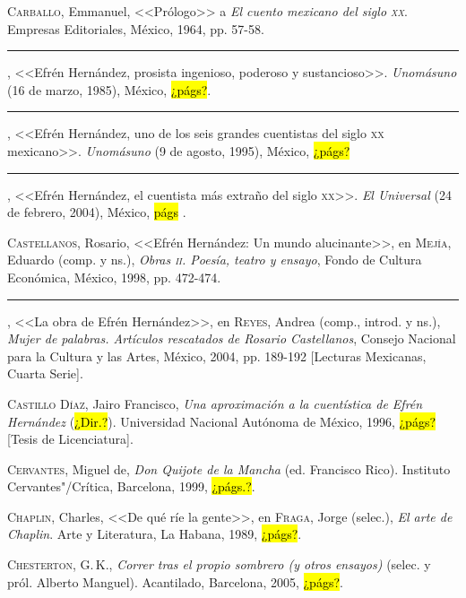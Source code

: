 \documentclass[14pt,twoside,final]{extbook} %
\begin{document}
\textsc{Carballo}, Emmanuel, <<Prólogo>> a \emph{El cuento mexicano del siglo \textsc{xx}}. Empresas Editoriales, México, 1964, pp. 57-58.\label{bib:carballo1964}

\rule{1cm}{0.4pt}, <<Efrén Hernández, prosista ingenioso, poderoso y sustancioso>>. \emph{Unomásuno} (16 de marzo, 1985), México, \hl{¿págs?}.\label{bib:carballo1985}

\rule{1cm}{0.4pt}, <<Efrén Hernández, uno de los seis grandes cuentistas del siglo \textsc{xx} mexicano>>. \emph{Unomásuno} (9 de agosto, 1995), México, \hl{¿págs?}\label{bib:carballo1995}

\rule{1cm}{0.4pt}, <<Efrén Hernández, el cuentista más extraño del siglo \textsc{xx}>>. \emph{El Universal} (24 de febrero, 2004), México, \hl{págs} .\label{bib:carballo2004}

\textsc{Castellanos}, Rosario, <<Efrén Hernández: Un mundo alucinante>>, en \textsc{Mejía}, Eduardo (comp. y ns.), \emph{Obras \textsc{ii}. Poesía, teatro y ensayo}, Fondo de Cultura Económica, México, 1998, pp. 472-474.\label{bib:castellanos1998}

\rule{1cm}{0.4pt}, <<La obra de Efrén Hernández>>, en \textsc{Reyes}, Andrea (comp., introd. y ns.), \emph{Mujer de palabras. Artículos rescatados de Rosario Castellanos}, Consejo Nacional para la Cultura y las Artes, México, 2004, pp. \mbox{189-192} [Lecturas Mexicanas, Cuarta Serie].\label{bib:castellanos2004}

\textsc{Castillo Díaz}, Jairo Francisco, \emph{Una aproximación a la cuentística de Efrén Hernández} (\hl{¿Dir.?}). Universidad Nacional Autónoma de México, 1996, \hl{¿págs?} [Tesis de Licenciatura].\label{bib:castillo1996}

\textsc{Cervantes}, Miguel de, \emph{Don Quijote de la Mancha} (ed. Francisco Rico). Instituto Cervantes"/Crítica, Barcelona, 1999, \hl{¿págs.?}.\label{bib:cervantes1999}

\textsc{Chaplin}, Charles, <<De qué ríe la gente>>, en \textsc{Fraga}, Jorge (selec.), \emph{El arte de Chaplin}. Arte y Literatura, La Habana, 1989, \hl{¿págs?}.\label{bib:chaplin1989}

\textsc{Chesterton}, G.\,K., \emph{Correr tras el propio sombrero (y otros ensayos)} (selec. y pról. Alberto Manguel). Acantilado, Barcelona, 2005, \hl{¿págs?}.\label{bib:chesterton2005}
\end{document}
